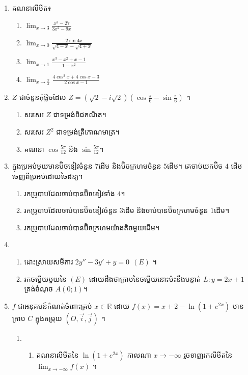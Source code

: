 \documentclass{officialexam}
\begin{document}
\begin{enumerate}[I]
	\item គណនាលីមីត៖ 
	\begin{enumerate}[k,4]
		\item $\lim_{x\to3}\frac{x^3-27}{3x^2-9x}$
		\item $\lim_{x\to0}\frac{-2\sin4x}{\sqrt{4-x}-\sqrt{4+x}}$
		\item $\lim_{x\to1}\frac{x^3-x^2+x-1}{1-x^2}$
		\item $\lim_{x\to\frac{\pi}{3}}\frac{4\cos^2x+4\cos x-3}{2\cos x-1}$
	\end{enumerate}
	\item $Z$ ជាចំនួនកុំផ្លិចដែល $Z=\left(\sqrt{2}-i\sqrt{2}\right)\left(\cos\frac{\pi}{6}-\sin\frac{\pi}{6}\right)$ ។
	\begin{enumerate}[k]
		\item សរសេរ $Z$ ជាទម្រង់ពិជគណិត។
		\item សរសេរ $Z^2$ ជាទម្រង់ត្រីកោណមាត្រ។
		\item គណនា $\cos\frac{5\pi}{12}$ និង $\sin\frac{5\pi}{12}$។
	\end{enumerate}
	\item ក្នុងប្រអប់មួយមានប៊ិចខៀវចំនួន $7$ដើម និងប៊ិចក្រហមចំនួន $5$ដើម។ គេចាប់យកប៊ិច $4$ ដើមចេញពីប្រអប់ដោយចៃដន្យ។
	\begin{enumerate}[k]
		\item រកប្រូបាបដែលចាប់បានប៊ិចខៀវទាំង $4$។
		\item រកប្រូបាបដែលចាប់បានប៊ិចខៀវចំនួន $3$ដើម និងចាប់បានប៊ិចក្រហមចំនួន $1$ដើម។
		\item រកប្រូបាបដែលចាប់បានប៊ិចក្រហមយ៉ាងតិចមួយដើម។
	\end{enumerate}
	\item \begin{enumerate}[k]
		\item ដោះស្រាយសមីការ $2y''-3y'+y=0~~(E)$ ។
		\item រកចម្លើយមួយនៃ $(E)$ ដោយដឹងថាក្រាបនៃចម្លើយនោះប៉ះនឹងបន្ទាត់ $L: y=2x+1$ ត្រង់ចំណុច $A(0;1)$។
	\end{enumerate}
	\item $f$ ជាអនុគមន៍កំណត់ចំពោះគ្រប់ $x\in\mathbb{R}$ ដោយ $f(x)=x+2-\ln\left(1+e^{2x}\right)$ មានក្រាប $C$ ក្នុងតម្រុយ $\left(O, \vec{i}, \vec{j}\right)$ ។
	\begin{enumerate}[1]
		\item \begin{enumerate}[k]
			\item គណនាលីមីតនៃ $\ln\left(1+e^{2x}\right)$ កាលណា $x\to-\infty$ រួចទាញរកលីមីតនៃ $\lim_{x\to-\infty}f(x)$ ។

\end{enumerate}
\end{enumerate}
\end{enumerate}
\end{document}
